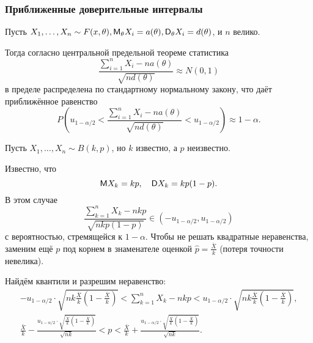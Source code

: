\subsubsection{Приближенные доверительные интервалы}
  Пусть $X_1, \dots, X_n \sim F(x, \theta), \mathsf M_\theta X_i = a(\theta), \mathsf D_\theta
	X_i = d(\theta)$, и $n$ велико. 

	Тогда согласно центральной предельной теореме статистика
\[
	\frac{\sum_{i=1}^n X_i - n a(\theta)}{\sqrt{n d(\theta)}} \approx N(0, 1)
\]
в пределе распределена по стандартному нормальному закону, что даёт приближённое
равенство
\[
	P\left(u_{1 - \alpha/2} < \frac{\sum_{i=1}^n X_i - n a(\theta)}{\sqrt{n d(\theta)}}<
	u_{1-\alpha/2}\right) \approx 1 - \alpha.
\]

\begin{ex}
  Пусть $X_1, \dots, X_n \sim B(k, p)$, но $k$ известно, а $ p $ неизвестно.

	Известно, что 
	\[
		\mathsf M X_k = kp, \quad \mathsf D X_k = k p (1-p).
	\]
В этом случае
\[
	\frac{\sum_{k=1}^n X_k - n k p}{\sqrt{nkp(1-p)}} \in (-u_{1-\alpha/2}, u_{1-\alpha/2})
\]
с вероятностью, стремящейся к $ 1 - \alpha $. Чтобы не решать квадратные
неравенства, заменим ещё $ p $ под корнем в
знаменателе оценкой $\hat p = \frac{\bar X}{k}$ (потеря точности невелика). 

Найдём квантили и разрешим неравенство:
\begin{gather*}
	-u_{1-\alpha/2}\cdot \sqrt{nk \frac{\bar X}{k} \left(1 - \frac{\bar X}{k}\right)} <
	\sum_{k=1}^n X_k -
	nkp < u_{1-\alpha/2} \cdot \sqrt{nk \frac{\bar X}{k} \left(1 - \frac{\bar X}{k}\right)}, \\
	\frac{\bar X}{k} - \frac{u_{1-\alpha/2}\cdot \sqrt{\frac{\bar X}{k} \left(1 - \frac{\bar
	X}{k}\right)}}{\sqrt{nk}} < p < \frac{\bar X}{k} + \frac{u_{1-\alpha/2}
\cdot \sqrt{\frac{\bar X}{k} \left(1 - \frac{\bar X}{k}\right)}}{\sqrt{nk}}.
\end{gather*}
\end{ex}
